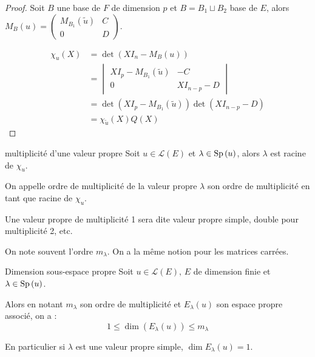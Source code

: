 
\begin{proof}
    Soit $B$ une base de $F$ de dimension $p$ et $B = B_1 \sqcup B_2$ base de $E$, alors 
    $M_B(u) = \begin{pmatrix}
        M_{B_1}(\tilde u) & C \\
        0 & D
    \end{pmatrix}$.

    \begin{align}
        \chi_u(X) & = \det(X I_n - M_B(u)) \\
                    & = \begin{vmatrix}
                        X I_p - M_{B_1}(\tilde u) & -C \\
                        0 & X I_{n - p} - D
                    \end{vmatrix} \\
                    & = \det(X I_p - M_{B_1}(\tilde u)) \det(X I_{n - p} - D) \\
                    & = \chi_{\tilde u}(X) Q (X)
    \end{align}
\end{proof}

\begin{definition}{multiplicité d'une valeur propre}{}
    Soit $u \in \mathscr L(E)$ et $\lambda \in \operatorname{Sp} \,(u)$,
    alors $\lambda $ est racine de $\chi_u$.

    On appelle ordre de multiplicité de la valeur propre $\lambda$ son ordre de multiplicité en tant que racine de $\chi_u$.
\end{definition}

\begin{exemple}
    Une valeur propre de multiplicité 1 sera dite valeur propre simple, double pour multiplicité 2, etc.

    On note souvent l'ordre $m_\lambda$. On a la même notion pour les matrices carrées. 
\end{exemple}

\begin{proposition}{Dimension sous-espace propre}{}
    Soit $u \in \mathscr L(E), \, E$ de dimension finie et $\lambda \in \operatorname{Sp} \,(u)$. 

    Alors en notant $m_\lambda$ son ordre de multiplicité et $E_\lambda(u)$ son espace propre associé, on a :
    $$1 \leqslant \dim(E_\lambda(u)) \leqslant m_\lambda$$

    En particulier si $\lambda$ est une valeur propre simple, $\dim E_\lambda (u) = 1$.
\end{proposition}

